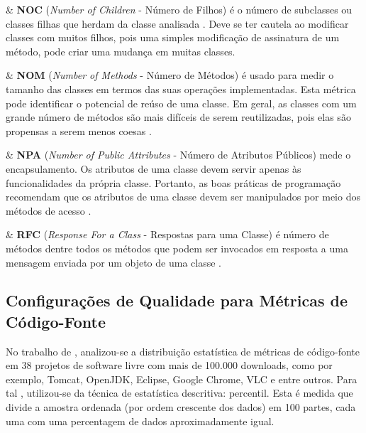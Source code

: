 \begin{easylist}
	& \textbf{NOC} (\textit{Number of Children} - Número de Filhos)
	é o número de subclasses ou classes filhas que herdam da classe analisada 
	\cite{Rosenberg97}. Deve se ter cautela ao modificar classes com muitos 
	filhos, pois uma simples modificação de assinatura de um método, pode criar
	uma mudança em muitas classes.


	& \textbf{NOM} (\textit{Number of Methods} - Número de Métodos) é usado 
	para medir o tamanho das classes em termos das suas operações 
	implementadas. Esta métrica pode identificar o 
	potencial de reúso de uma classe. Em geral, as classes com um grande 
	número de métodos são mais difíceis de serem reutilizadas, pois elas 
	são propensas a serem menos coesas \cite{Lorenz94}.
	

	& \textbf{NPA} (\textit{Number of Public Attributes} - Número de Atributos Públicos) mede o encapsulamento. Os atributos de uma classe devem servir apenas às funcionalidades da própria classe. Portanto, as boas práticas de programação recomendam que os atributos de uma classe devem ser manipulados por meio dos métodos de acesso \cite{beck1997smalltalk}.



	& \textbf{RFC} (\textit{Response For a Class} - Respostas para uma 
	Classe) é número de métodos dentre todos os métodos que podem ser invocados 
	em resposta a uma mensagem enviada por um objeto de uma classe 
	\cite{Sharble93}.





\end{easylist}
	
\subsection{Configurações de Qualidade para Métricas de Código-Fonte}
\label{sec:Intervalos das Métricas}

No trabalho de , analizou-se a distribuição estatística de métricas de código-fonte em 38 projetos de software livre com mais de 100.000 downloads, como por exemplo, Tomcat, OpenJDK, Eclipse, Google Chrome, VLC e entre outros. Para tal , utilizou-se da técnica de estatística descritiva: percentil. Esta é medida que divide a amostra ordenada (por ordem crescente dos dados) em 100 partes, cada uma com uma percentagem de dados aproximadamente igual. 

